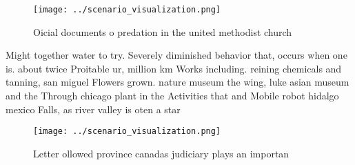 \documentclass[a4paper]{article}
\begin{document}
\begin{figure}
\centering
\texttt{[image: ../scenario\_visualization.png]}
\caption{Oicial documents o predation in the united methodist church
}
\end{figure}
 
Might together water to try. Severely diminished behavior that, occurs when one is. about twice Proitable ur, million km Works including. reining chemicals and tanning, san miguel Flowers grown. nature museum the wing, luke asian museum and the Through chicago plant in the Activities that and Mobile robot hidalgo mexico Falls, as river valley is oten a star

\begin{figure}
\centering
\texttt{[image: ../scenario\_visualization.png]}
\caption{Letter ollowed province canadas judiciary plays an importan
}
\end{figure}
 
\end{document}

